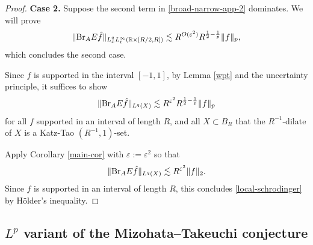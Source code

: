 \documentclass{amsart}
\numberwithin{equation}{section}
\newcommand{\e}{\varepsilon}
\newcommand{\ZR}{\mathbb{R}}
\newcommand{\BR}{{\rm{Br}}}
\begin{document}
\begin{proof}
\smallskip

{\bf Case 2. } Suppose the second term in \eqref{broad-narrow-app-2} dominates.
We will prove 
\begin{equation}
    \|\BR_A E\hat f\|_{L^q_xL^\infty_t(\ZR\times[R/2,R])}\lesssim R^{O(\e^2)}R^{\frac{1}{2}-\frac{1}{p}}\|f\|_{p},
\end{equation}
which concludes the second case.

Since $\hat f$ is supported in the interval $[-1,1]$, by Lemma \ref{wpt} and the uncertainty principle, it suffices to show 
\begin{equation}
\label{local-schrodinger}
    \|\BR_A E\hat f\|_{L^q(X)}\lesssim R^{\e^2}R^{\frac{1}{2}-\frac{1}{p}}\|f\|_{p}
\end{equation}
for all $f$ supported in an interval of length $R$, and all $X\subset B_R$ that the $R^{-1}$-dilate of $X$ is a Katz-Tao $(R^{-1},1)$-set.

Apply Corollary \ref{main-cor} with $\e:=\e^2$ so that 
\begin{equation}
    \|\BR_A E\hat f\|_{L^q(X)}\lesssim R^{\e^2}\|f\|_2.
\end{equation}
Since $f$ is supported in an interval of length $R$, this concludes \eqref{local-schrodinger} by H\"older's inequality.
\qedhere

\end{proof}




\medskip


\subsection{\texorpdfstring{$L^p$}{} variant of the Mizohata–Takeuchi conjecture}
\end{document}

